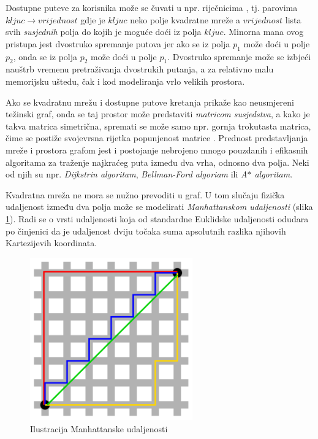 \documentclass[times, utf8, diplomski, numeric]{fer}
\begin{document}
Dostupne puteve za korisnika može se čuvati u npr. riječnicima
, tj. parovima $kljuc \rightarrow vrijednost$ gdje je $kljuc$
neko polje kvadratne mreže a $vrijednost$ lista svih \emph{susjednih} polja do
kojih je moguće doći iz polja $kljuc$. Minorna mana ovog pristupa jest
dvostruko spremanje putova jer ako se iz polja $p_1$ može doći u polje $p_2$,
onda se iz polja $p_2$ može doći u polje $p_1$. Dvostruko spremanje može se
izbjeći nauštrb vremenu pretraživanja dvostrukih putanja, a za relativno malu
memorijsku uštedu, čak i kod modeliranja vrlo velikih prostora.

Ako se kvadratnu mrežu i dostupne putove kretanja prikaže kao neusmjereni
težinski graf, onda se taj prostor može predstaviti \emph{matricom
susjedstva}, a kako je takva matrica simetrična, spremati se može samo npr.
gornja trokutasta matrica, čime se postiže svojevrsna rijetka popunjenost
matrice .
Prednost predstavljanja mreže i prostora grafom jest i postojanje nebrojeno
mnogo pouzdanih i efikasnih algoritama za traženje najkraćeg puta između dva
vrha, odnosno dva polja. Neki od njih su npr. \emph{Dijkstrin algoritam},
\emph{Bellman-Ford algoriam} ili \emph{A$\ast$ algoritam}.

Kvadratna mreža ne mora se nužno prevoditi u graf. U tom slučaju fizička
udaljenost između dva polja može se modelirati \emph{Manhattanskom udaljenosti}
(slika \ref{fig:ManhattanDistance}). Radi se o vrsti udaljenosti koja od
standardne Euklidske udaljenosti odudara po činjenici da je udaljenost dviju
točaka suma apsolutnih razlika njihovih Kartezijevih koordinata.

 \begin{figure}[H]
	\centering
	\includegraphics[width=7cm]{images/Manhattan_distance.png}
	\caption{Ilustracija Manhattanske udaljenosti}
	\label{fig:ManhattanDistance}
\end{figure}
\end{document}
